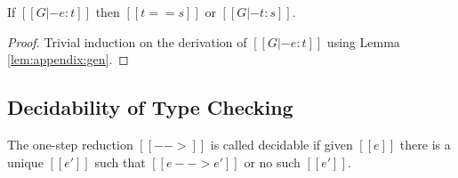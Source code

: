 \begin{lem}\label{lem:appendix:corrtyp}
    If $[[G |- e:t]]$ then $[[t == s]]$ or $[[G |- t : s]]$.
\end{lem}

\begin{proof}
    Trivial induction on the derivation of $[[G |- e:t]]$ using Lemma
\ref{lem:appendix:gen}.
\end{proof}

\subsection{Decidability of Type Checking}
\begin{lem}\label{lem:appendix:unired}
	The one-step reduction $[[-->]]$ is called decidable if 
given $[[e]]$ there is a unique $[[e']]$ such that $[[e --> e']]$ or no such $[[e']]$.
\end{lem}

